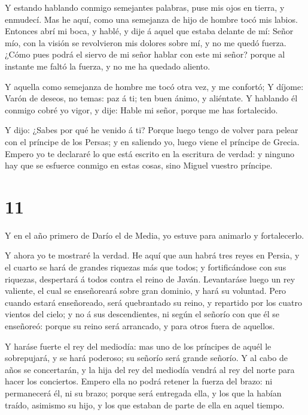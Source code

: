  Y estando hablando conmigo semejantes palabras, puse mis
ojos en tierra, y enmudecí.  Mas he aquí, como una
semejanza de hijo de hombre tocó mis labios. Entonces abrí mi boca, y
hablé, y dije á aquel que estaba delante de mí: Señor mío, con la visión
se revolvieron mis dolores sobre mí, y no me quedó fuerza. 
¿Cómo pues podrá el siervo de mi señor hablar con este mi señor? porque
al instante me faltó la fuerza, y no me ha quedado aliento.

 Y aquella como semejanza de hombre me tocó otra vez, y me
confortó;  Y díjome: Varón de deseos, no temas: paz á ti;
ten buen ánimo, y aliéntate. Y hablando él conmigo cobré yo vigor, y
dije: Hable mi señor, porque me has fortalecido.

 Y dijo: ¿Sabes por qué he venido á ti? Porque luego tengo
de volver para pelear con el príncipe de los Persas; y en saliendo yo,
luego viene el príncipe de Grecia.  Empero yo te declararé
lo que está escrito en la escritura de verdad: y ninguno hay que se
esfuerce conmigo en estas cosas, sino Miguel vuestro príncipe.

\hypertarget{section-10}{%
\section{11}\label{section-10}}

 Y en el año primero de Darío el de Media, yo estuve para
animarlo y fortalecerlo.

 Y ahora yo te mostraré la verdad. He aquí que aun habrá
tres reyes en Persia, y el cuarto se hará de grandes riquezas más que
todos; y fortificándose con sus riquezas, despertará á todos contra el
reino de Javán.  Levantaráse luego un rey valiente, el cual
se enseñoreará sobre gran dominio, y hará su voluntad.  Pero
cuando estará enseñoreado, será quebrantado su reino, y repartido por
los cuatro vientos del cielo; y no á sus descendientes, ni según el
señorío con que él se enseñoreó: porque su reino será arrancado, y para
otros fuera de aquellos.

 Y haráse fuerte el rey del mediodía: mas uno de los
príncipes de aquél le sobrepujará, y se hará poderoso; su señorío será
grande señorío.  Y al cabo de años se concertarán, y la hija
del rey del mediodía vendrá al rey del norte para hacer los conciertos.
Empero ella no podrá retener la fuerza del brazo: ni permanecerá él, ni
su brazo; porque será entregada ella, y los que la habían traído,
asimismo su hijo, y los que estaban de parte de ella en aquel tiempo.

